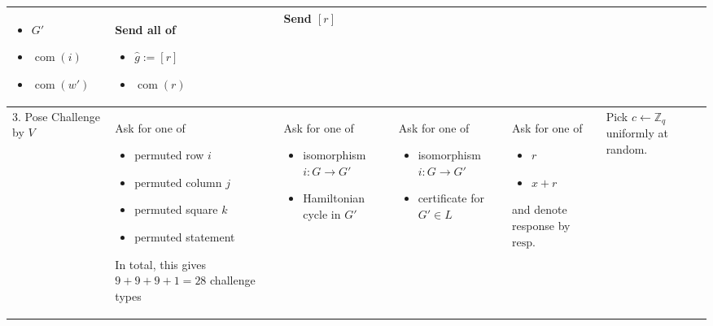 \documentclass[border=1cm,varwidth=37cm]{standalone}
\DeclareMathOperator\com{com}
\newcommand\graph{G}
\newcommand\graphP{G'}
\newcommand\graphCertP{w'}
\newcommand\response{\text{resp.}}
\begin{document}
\begin{threeparttable}
\begin{tabular}{m{4cm}|m{6cm}|m{6cm}|m{6cm}|m{6cm}|m{6cm}}
\begin{itemize}
		\item $\graphP$
		\item $\com(i)$
		\item $\com(\graphCertP)$
	\end{itemize}
	&Send all of
	\begin{itemize}
			\item $\hat{g} := [r]$
			\item $\com(r)$
	\end{itemize}
	&Send $[r]$\\\hline
	3. Pose Challenge by $V$
	&Ask for one of
	\begin{itemize}
		\item permuted row $i$
		\item permuted column $j$
		\item permuted square $k$
		\item permuted statement
	\end{itemize}
	In total, this gives $9+9+9+1 = 28$ challenge types
	&Ask for one of\begin{itemize}
		\item isomorphism $i\colon\graph \to \graphP$
		\item Hamiltonian cycle in $\graphP$
	\end{itemize}
	& Ask for one of\begin{itemize}
		\item isomorphism $i\colon\graph \to \graphP$
		\item certificate for $\graphP \in L$
	\end{itemize}
	& Ask for one of\begin{itemize}
		\item $r$
		\item $x + r$
	\end{itemize} and denote response by $\response$
	& Pick $c \leftarrow \mathbb{Z}_q$ uniformly at random.


\end{tabular}
\end{threeparttable}
\end{document}
